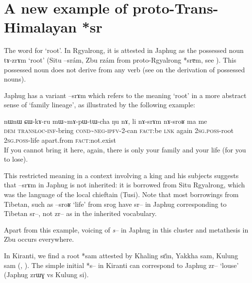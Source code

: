 \documentclass[oldfontcommands,oneside,a4paper,11pt]{article}
\newcommand{\ipa}[1]{{\phon #1}} %
\begin{document}
\section{A new example of proto-Trans-Himalayan *\ipa{sr}}


The word for `root'. In Rgyalrong, it is attested in Japhug as the possessed noun \ipa{tɤ-zrɤm} `root' (Situ \ipa{--srám}, Zbu \ipa{rzám} from proto-Rgyalrong *\ipa{srɐm}, see \citealt[243]{jacques04these}). This possessed noun does not derive from any verb (see \citealt[3-7]{jacques14antipassive} on the derivation of possessed nouns).

Japhug has a variant \ipa{--srɤm} which refers to the meaning `root' in a more abstract sense of `family lineage', as illustrated by the following example:

\begin{exe}
\ex \label{ex:sram}
\gll
\ipa{nɯnɯ} 	\ipa{ɕɯ-kɤ-ru} 	\ipa{mɯ\textasciitilde{}mɤ-pɯ-tɯ-cha} 	\ipa{ŋu} 	\ipa{nɤ,} 	\ipa{li} 	\ipa{nɤ-srɤm} 	\ipa{nɤ-sroʁ} 	\ipa{ma} 	\ipa{me} \\
\textsc{dem} \textsc{transloc-inf}-bring \textsc{cond\textasciitilde{}neg-ipfv}-2-can \textsc{fact}:be \textsc{lnk} again \textsc{2sg.poss}-root \textsc{2sg.poss}-life apart.from \textsc{fact}:not.exist\\
\glt If you cannot bring it here, again, there is only your family and your life (for you to lose).
\end{exe}

This restricted meaning in a context involving a king and his subjects suggests that \ipa{--srɤm} in Japhug is not inherited: it is borrowed from Situ Rgyalrong, which was the language of the local chieftain (Tusi). Note that most borrowings from Tibetan, such as \ipa{--sroʁ} `life' from \ipa{srog} have \ipa{sr--} in Japhug corresponding to Tibetan \ipa{sr--}, not \ipa{zr--} as in the inherited vocabulary.

Apart from this example, voicing of \textit{s--} in Japhug in this cluster and metathesis in Zbu occurs everywhere.

In Kiranti, we find a root *sam attested by Khaling \ipa{sɛ̄m}, Yakkha  \ipa{sam}, Kulung \ipa{sam} (\citealt{kongren07yakkha}, \citealt{tolsma06kulung}). The simple initial *s-- in Kiranti can correspond to Japhug \ipa{zr--} `louse' (Japhug \ipa{zrɯɣ} vs Kulung \ipa{si}).
\end{document}
